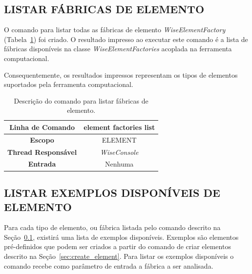 \subsection{LISTAR FÁBRICAS DE ELEMENTO}\label{sec:list_element_factories}

O comando para listar todas as fábricas de elemento \textit{WiseElementFactory} (Tabela~\ref{tab:list_element_factories}) foi criado. O resultado impresso ao executar este comando é a lista de fábricas disponíveis na classe \textit{WiseElementFactories} acoplada na ferramenta computacional.

Consequentemente, os resultados impressos representam os tipos de elementos suportados pela ferramenta computacional.

\begin{center}
	\begin{table}[!htbp]
		\begin{tabularx}{\textwidth}{c|X}
			\toprule
			\textbf{Linha de Comando} & \multicolumn{1}{c}{element factories list} \\
			\midrule
			\textbf{Escopo} & \multicolumn{1}{c}{ELEMENT} \\
			\hline
			\textbf{Thread Responsável} & \multicolumn{1}{c}{\textit{WiseConsole}} \\
			\hline
			\textbf{Entrada} & \multicolumn{1}{c}{Nenhuma} \\
			\bottomrule
		\end{tabularx}
		\caption{Descrição do comando para listar fábricas de elemento.}
		\label{tab:list_element_factories}
	\end{table}
\end{center}

\subsection{LISTAR EXEMPLOS DISPONÍVEIS DE ELEMENTO}\label{sec:list_example_element_factories}

Para cada tipo de elemento, ou fábrica listada pelo comando descrito na Seção~\ref{sec:list_element_factories}, existirá uma lista de exemplos disponíveis. Exemplos são elementos pré-definidos que podem ser criados a partir do comando de criar elementos descrito na Seção~\ref{sec:create_element}. Para listar os exemplos disponíveis o comando recebe como parâmetro de entrada a fábrica a ser analisada.

